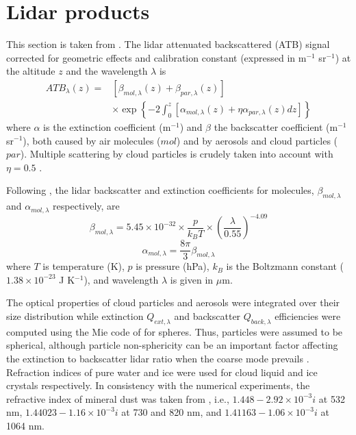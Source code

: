 \section{Lidar products}
%
This section is taken from \citet{Chaboureau2011}. The lidar attenuated backscattered (ATB) signal corrected for geometric effects and calibration constant (expressed in m$^{-1}$ sr$^{-1}$) at the altitude $z$ and the wavelength $\lambda$ is
\begin{eqnarray}
ATB_{\lambda}(z) = 
 & \left[ \beta_{mol,\lambda}(z) + \beta_{par,\lambda}(z) \right] \\
 & \times \exp \left\{ -2 \int_0^z 
   \left[\alpha_{mol,\lambda}(z) + \eta \alpha_{par,\lambda}(z) dz
   \right] \right\}  \nonumber
\end{eqnarray} where $\alpha$ is the extinction coefficient (m$^{-1}$) and $\beta$ the backscatter coefficient (m$^{-1}$ sr$^{-1}$), both caused by air molecules (${mol}$) and by aerosols and cloud particles (${par}$). Multiple scattering by cloud particles is crudely taken into account with $\eta=0.5$ \citep{Platt1973}.

Following \citet{Collis1976}, the lidar backscatter and extinction coefficients for molecules, $\beta_{mol,\lambda}$ and $\alpha_{mol,\lambda}$ respectively, are 
\begin{equation}
\beta_{mol,\lambda}=5.45 \times 10^{-32} \times \frac{p}{k_B T} 
\times \left( \frac{\lambda}{0.55} \right)^{-4.09}
\end{equation}
\begin{equation}
\alpha_{mol,\lambda}= \frac{8 \pi}{3} \beta_{mol,\lambda}
\end{equation}
where $T$ is temperature (K), $p$ is pressure (hPa),  $k_B$ is the Boltzmann constant ($1.38 \times 10^{-23}$ J K$^{-1}$), and wavelength $\lambda$ is given in $\mu$m.

The optical properties of cloud particles and aerosols were integrated over their size distribution while extinction $Q_{ext,\lambda}$ and backscatter $Q_{back,\lambda}$ efficiencies were computed using the Mie code of \citet{Bohren1985} for spheres. Thus, particles were assumed to be spherical, although particle non-sphericity can be an important factor affecting the extinction to backscatter lidar ratio when the coarse mode prevails \citep{Dubovik2006}. Refraction indices of pure water and ice were used for cloud liquid and ice crystals respectively. In consistency with the numerical experiments, the refractive index of mineral dust was taken from \citet{Tulet2008}, i.e., $1.448-2.92 \times 10^{-3}i$ at 532 nm, $1.44023 - 1.16 \times 10^{-3}i$ at 730 and 820 nm, and $1.41163 - 1.06 \times 10^{-3}i$ at 1064 nm.

